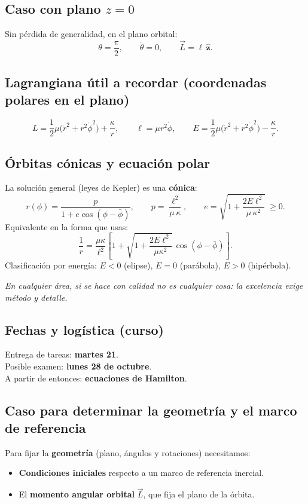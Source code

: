 \documentclass{article}
\begin{document}
\subsection{Caso con plano $z=0$}
Sin pérdida de generalidad, en el plano orbital:
\[
\theta=\frac{\pi}{2},\qquad \dot{\theta}=0,\qquad \vec{L}=\ell\,\hat{\mathbf z}.
\]

\subsection{Lagrangiana útil a recordar (coordenadas polares en el plano)}
\[
L=\frac{1}{2}\mu\big(\dot r^{2}+r^{2}\dot{\phi}^{2}\big)+\frac{\kappa}{r},\qquad
\ell=\mu r^{2}\dot{\phi},\qquad
E=\frac{1}{2}\mu\big(\dot r^{2}+r^{2}\dot{\phi}^{2}\big)-\frac{\kappa}{r}.
\]

\subsection*{Órbitas cónicas y ecuación polar}
La solución general (leyes de Kepler) es una \textbf{cónica}:
\[
r(\phi)=\frac{p}{1+e\cos(\phi-\bar{\phi})},
\qquad
p=\frac{\ell^{2}}{\mu\,\kappa},\qquad
e=\sqrt{1+\frac{2E\ell^{2}}{\mu\,\kappa^{2}}}\ \ge 0.
\]
Equivalente en la forma que usas:
\[
\frac{1}{r}=\frac{\mu\kappa}{\ell^{2}}
\left[
1+\sqrt{1+\frac{2E\ell^{2}}{\mu\kappa^{2}}}\,\cos(\phi-\bar{\phi})
\right].
\]
Clasificación por energía: \(E<0\) (elipse), \(E=0\) (parábola), \(E>0\) (hipérbola).

\medskip
\emph{En cualquier área, si se hace con calidad no es cualquier cosa: la excelencia exige método y detalle.}

\subsection*{Fechas y logística (curso)}
Entrega de tareas: \textbf{martes 21}. \\
Posible examen: \textbf{lunes 28 de octubre}. \\
A partir de entonces: \textbf{ecuaciones de Hamilton}.

\subsection{Caso para determinar la geometría y el marco de referencia}

Para fijar la \textbf{geometría} (plano, ángulos y rotaciones) necesitamos:
\begin{itemize}
  \item \textbf{Condiciones iniciales} respecto a un marco de referencia inercial.
  \item El \textbf{momento angular orbital} \(\vec{L}\), que fija el plano de la órbita.
\end{itemize}
\end{document}
